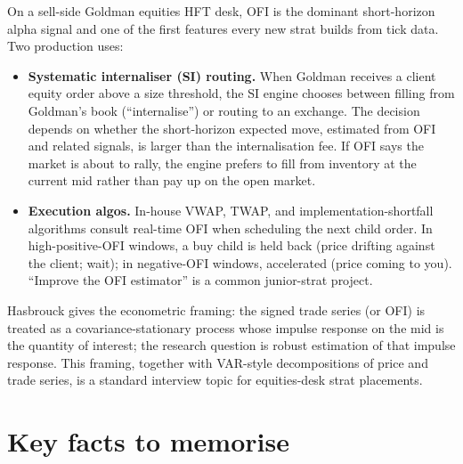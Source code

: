 \begin{gsbox}
On a sell-side Goldman equities HFT desk, OFI is the dominant
short-horizon alpha signal and one of the first features every
new strat builds from tick data. Two production uses:

\begin{itemize}
  \item \textbf{Systematic internaliser (SI) routing.} When
  Goldman receives a client equity order above a size threshold,
  the SI engine chooses between filling from Goldman's book
  (``internalise'') or routing to an exchange. The decision
  depends on whether the short-horizon expected move,
  estimated from OFI and related signals, is larger than the
  internalisation fee. If OFI says the market is about to rally,
  the engine prefers to fill from inventory at the current mid
  rather than pay up on the open market.
  \item \textbf{Execution algos.} In-house VWAP, TWAP, and
  implementation-shortfall algorithms consult real-time OFI when
  scheduling the next child order. In high-positive-OFI windows,
  a buy child is held back (price drifting against the client;
  wait); in negative-OFI windows, accelerated (price coming to
  you). ``Improve the OFI estimator'' is a common junior-strat
  project.
\end{itemize}

Hasbrouck \citeHasbrouck{} gives the econometric framing: the
signed trade series (or OFI) is treated as a covariance-stationary
process whose impulse response on the mid is the quantity of
interest; the research question is robust estimation of that
impulse response. This framing, together with VAR-style
decompositions of price and trade series, is a standard interview
topic for equities-desk strat placements.
\end{gsbox}

\section{Key facts to memorise}
\label{sec:ch7_summary}


